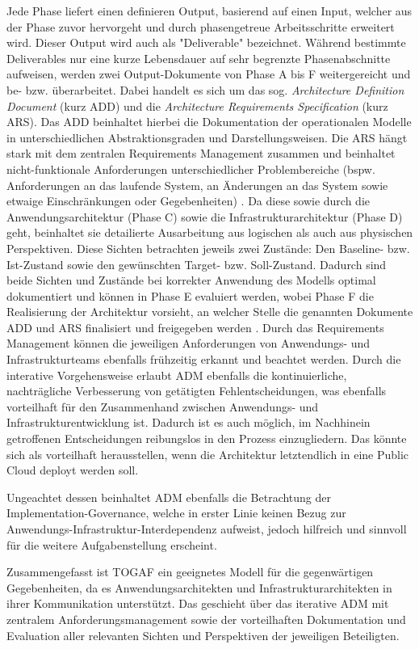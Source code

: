 Jede Phase liefert einen definieren Output, basierend auf einen Input, welcher aus der Phase zuvor hervorgeht und durch phasengetreue Arbeitsschritte erweitert wird. Dieser Output wird auch als "Deliverable" bezeichnet. Während bestimmte Deliverables nur eine kurze Lebensdauer auf sehr begrenzte Phasenabschnitte aufweisen, werden zwei Output-Dokumente von Phase A bis F weitergereicht und be- bzw. überarbeitet. Dabei handelt es sich um das sog. \textit{Architecture Definition Document} (kurz ADD) und die \textit{Architecture Requirements Specification} (kurz ARS). Das ADD beinhaltet hierbei die Dokumentation der operationalen Modelle in unterschiedlichen Abstraktionsgraden und Darstellungsweisen. Die ARS hängt stark mit dem zentralen Requirements Management zusammen und beinhaltet nicht-funktionale Anforderungen unterschiedlicher Problembereiche (bspw. Anforderungen an das laufende System, an Änderungen an das System sowie etwaige Einschränkungen oder Gegebenheiten) \cite{Skript}. Da diese sowie durch die Anwendungsarchitektur (Phase C) sowie die Infrastrukturarchitektur (Phase D) geht, beinhaltet sie detailierte Ausarbeitung aus logischen als auch aus physischen Perspektiven. Diese Sichten betrachten jeweils zwei Zustände: Den Baseline- bzw. Ist-Zustand sowie den gewünschten Target- bzw. Soll-Zustand.  Dadurch sind beide Sichten und Zustände bei korrekter Anwendung des Modells optimal dokumentiert und können in Phase E evaluiert werden, wobei Phase F die Realisierung der Architektur vorsieht, an welcher Stelle die genannten Dokumente ADD und ARS finalisiert und freigegeben werden \cite{TOGAFDocs}\cite{VisualParadigmTOGAF}. Durch das Requirements Management können die jeweiligen Anforderungen von Anwendungs- und Infrastrukturteams ebenfalls frühzeitig erkannt und beachtet werden. Durch die interative Vorgehensweise erlaubt ADM ebenfalls die kontinuierliche, nachträgliche Verbesserung von getätigten Fehlentscheidungen, was ebenfalls vorteilhaft für den Zusammenhand zwischen Anwendungs- und Infrastrukturentwicklung ist. Dadurch ist es auch möglich, im Nachhinein getroffenen Entscheidungen reibungslos in den Prozess einzugliedern. Das könnte sich als vorteilhaft herausstellen, wenn die Architektur letztendlich in eine Public Cloud deployt werden soll.

Ungeachtet dessen beinhaltet ADM ebenfalls die Betrachtung der Implementation-Governance, welche in erster Linie keinen Bezug zur Anwendungs-Infrastruktur-Interdependenz aufweist, jedoch hilfreich und sinnvoll für die weitere Aufgabenstellung erscheint.

Zusammengefasst ist TOGAF ein geeignetes Modell für die gegenwärtigen Gegebenheiten, da es Anwendungsarchitekten und Infrastrukturarchitekten in ihrer Kommunikation unterstützt. Das geschieht über das iterative ADM mit zentralem Anforderungsmanagement sowie der vorteilhaften Dokumentation und Evaluation aller relevanten Sichten und Perspektiven der jeweiligen Beteiligten.